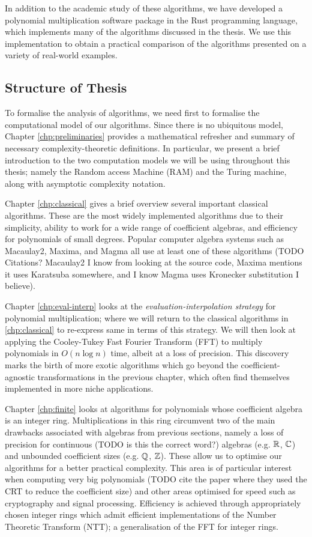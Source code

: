 In addition to the academic study of these algorithms, we have developed a polynomial multiplication software package in the Rust programming language, which implements many of the algorithms discussed in the thesis. We use this implementation to obtain a practical comparison of the algorithms presented on a variety of real-world examples.

\subsection{Structure of Thesis}
\label{sub:Structure-of-Thesis}

To formalise the analysis of algorithms, we need first to formalise the computational model of our algorithms. Since there is no ubiquitous model, Chapter \ref{chp:preliminaries} provides a mathematical refresher and summary of necessary complexity-theoretic definitions. In particular, we present a brief introduction to the two computation models we will be using throughout this thesis; namely the Random access Machine (RAM) and the Turing machine, along with asymptotic complexity notation.

Chapter \ref{chp:classical} gives a brief overview several important classical algorithms. These are the most widely implemented algorithms due to their simplicity, ability to work for a wide range of coefficient algebras, and efficiency for polynomials of small degrees. Popular computer algebra systems such as Macaulay2, Maxima, and Magma all use at least one of these algorithms (TODO Citations? Macaulay2 I know from looking at the source code, Maxima mentions it uses Karatsuba somewhere, and I know Magma uses Kronecker substitution I believe).

Chapter \ref{chp:eval-interp} looks at the \emph{evaluation-interpolation strategy} for polynomial multiplication; where we will return to the classical algorithms in \ref{chp:classical} to re-express same in terms of this strategy. We will then look at applying the Cooley-Tukey Fast Fourier Transform (FFT) to multiply polynomials in $O(n \log n)$ time, albeit at a loss of precision. This discovery marks the birth of more exotic algorithms which go beyond the coefficient-agnostic transformations in the previous chapter, which often find themselves implemented in more niche applications.

Chapter \ref{chp:finite} looks at algorithms for polynomials whose coefficient algebra is an integer ring. Multiplications in this ring circumvent two of the main drawbacks associated with algebras from previous sections, namely a loss of precision for continuous (TODO is this the correct word?) algebras (e.g. ${\mathbb R}$, ${\mathbb C}$) and unbounded coefficient sizes (e.g. ${\mathbb Q}$, ${\mathbb Z}$). These allow us to optimise our algorithms for a better practical complexity. This area is of particular interest when computing very big polynomials (TODO cite the paper where they used the CRT to reduce the coefficient size) and other areas optimised for speed such as cryptography and signal processing. Efficiency is achieved through appropriately chosen integer rings which admit efficient implementations of the Number Theoretic Transform (NTT); a generalisation of the FFT for integer rings.


